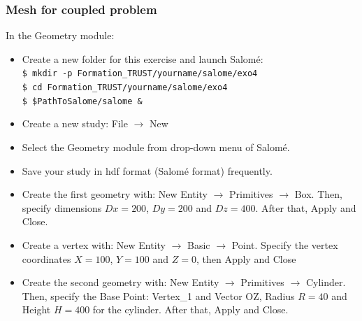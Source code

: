 \documentclass[10pt, hyperref={unicode=true,pdfusetitle, bookmarks=true,bookmarksnumbered=false,bookmarksopen=false, breaklinks=false,pdfborder={0 0 1},backref=true,colorlinks=true,linkcolor=darkblue,pageanchor}]{beamer}
\begin{document}
\begin{frame}
\frametitle{Mesh for coupled problem}

\begin{block}{In the Geometry module:}
\begin{itemize}

\item Create a new folder for this exercise and launch Salom\'e:\\
\texttt{\$ mkdir -p Formation\_TRUST/yourname/salome/exo4} \\
\texttt{\$ cd Formation\_TRUST/yourname/salome/exo4} \\
\texttt{\$ \$PathToSalome/salome \&} 

\item Create a new study: File $\rightarrow$ New

\item Select the Geometry module from drop-down menu of Salom\'e.

\item Save your study in hdf format (Salom\'e format) frequently.

\item Create the first geometry with: New Entity $\rightarrow$ Primitives $\rightarrow$ Box. Then, specify dimensions $Dx=200$,  $Dy=200$ and $Dz=400$. After that, Apply and Close.

\item Create a vertex with: New Entity $\rightarrow$ Basic $\rightarrow$ Point. Specify the vertex coordinates $X=100$, $Y=100$ and $Z=0$, then Apply and Close

\item Create the second geometry with: New Entity $\rightarrow$ Primitives $\rightarrow$ Cylinder. Then, specify the Base Point: Vertex\_1 and Vector OZ, Radius $R=40$ and Height $H=400$ for the cylinder. After that, Apply and Close.

\end{itemize}
\end{block}

\end{frame}
\end{document}
